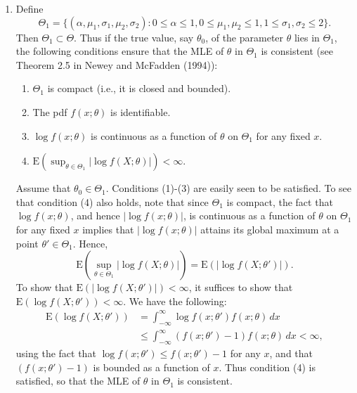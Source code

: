 \documentclass[12pt]{article}
\newcommand{\E}{\mathrm{E}}
\begin{document}
\begin{enumerate}
\begin{enumerate}[label=(\roman*)]
\item
Define
\begin{equation*}
\Theta_1 = \{(\alpha, \mu_1, \sigma_1, \mu_2, \sigma_2) : 0 \leq \alpha \leq 1, 0 \leq \mu_1, \mu_2 \leq 1, 1 \leq \sigma_1, \sigma_2 \leq 2\}.
\end{equation*}
Then $\Theta_1 \subset \Theta$. Thus if the true value, say $\theta_0$, of the parameter $\theta$ lies in $\Theta_1$, the following conditions ensure that the MLE of $\theta$ in $\Theta_1$ is consistent (see Theorem 2.5 in Newey and McFadden (1994)):
\begin{enumerate}[label=(\arabic*)]
\item
$\Theta_1$ is compact (i.e., it is closed and bounded).

\item
The pdf $f(x; \theta)$ is identifiable.

\item
$\log f(x; \theta)$ is continuous as a function of $\theta$ on $\Theta_1$ for any fixed $x$.

\item
$\E(\sup_{\theta \in \Theta_1} |\log f(X; \theta)|) < \infty$.

\end{enumerate}
Assume that $\theta_0 \in \Theta_1$. Conditions (1)-(3) are easily seen to be satisfied. To see that condition (4) also holds, note that since $\Theta_1$ is compact, the fact that $\log f(x; \theta)$, and hence $|\log f(x; \theta)|$, is continuous as a function of $\theta$ on $\Theta_1$ for any fixed $x$ implies that $|\log f(x; \theta)|$ attains its global maximum at a point $\theta' \in \Theta_1$. Hence,
\begin{equation*}
\E\left(\sup_{\theta \in \Theta_1} |\log f(X; \theta)|\right) = \E\left(|\log f(X; \theta')|\right).
\end{equation*}
To show that $\E\left(|\log f(X; \theta')|\right) < \infty$, it suffices to show that $\E\left(\log f(X; \theta')\right) < \infty$. We have the following:
\begin{align*}
\E\left(\log f(X; \theta')\right) &= \int_{-\infty}^\infty \log f(x; \theta') f(x; \theta) \, dx \\
&\leq \int_{-\infty}^\infty (f(x; \theta') - 1) f(x; \theta) \, dx < \infty,
\end{align*}
using the fact that $\log f(x; \theta') \leq f(x; \theta') - 1$ for any $x$, and that $(f(x; \theta') - 1)$ is bounded as a function of $x$. Thus condition (4) is satisfied, so that the MLE of $\theta$ in $\Theta_1$ is consistent.

\end{enumerate}

\end{enumerate}
\end{document}
